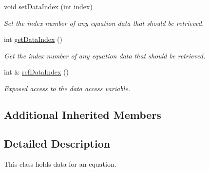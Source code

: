 \begin{DoxyCompactItemize}
\item 
void \hyperlink{classosea_1_1ofreq_1_1_equation_aa9e40c1cc6fb3cb030e9956663025a87}{set\-Data\-Index} (int index)
\begin{DoxyCompactList}\small\item\em Set the index number of any equation data that should be retrieved. \end{DoxyCompactList}\item 
int \hyperlink{classosea_1_1ofreq_1_1_equation_ac5fd13eba76ddbbf4813823fad4166e2}{get\-Data\-Index} ()
\begin{DoxyCompactList}\small\item\em Get the index number of any equation data that should be retrieved. \end{DoxyCompactList}\item 
int \& \hyperlink{classosea_1_1ofreq_1_1_equation_a5964477a42f3941a968f249b89742d73}{ref\-Data\-Index} ()
\begin{DoxyCompactList}\small\item\em Exposed access to the data access variable. \end{DoxyCompactList}\end{DoxyCompactItemize}
\subsection*{Additional Inherited Members}


\subsection{Detailed Description}
This class holds data for an equation. 


